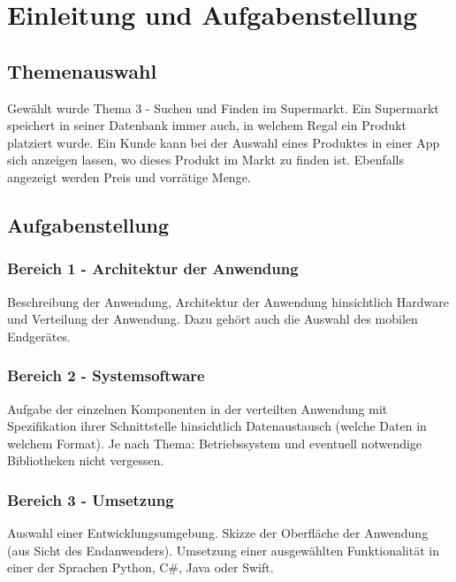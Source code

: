 \section{Einleitung und Aufgabenstellung}

\subsection{Themenauswahl}
Gewählt wurde Thema 3 - Suchen und Finden im Supermarkt.
Ein Supermarkt speichert in seiner Datenbank immer auch, in welchem Regal ein Produkt platziert wurde.
Ein Kunde kann bei der Auswahl eines Produktes in einer App sich anzeigen lassen, wo dieses Produkt im Markt zu finden ist.
Ebenfalls angezeigt werden Preis und vorrätige Menge.

\subsection{Aufgabenstellung}
\subsubsection{Bereich 1 - Architektur der Anwendung}
Beschreibung der Anwendung, Architektur der Anwendung hinsichtlich Hardware und Verteilung der Anwendung.
Dazu gehört auch die Auswahl des mobilen Endgerätes.

\subsubsection{Bereich 2 - Systemsoftware}
Aufgabe der einzelnen Komponenten in der verteilten Anwendung mit Spezifikation ihrer Schnittstelle hinsichtlich Datenaustausch (welche Daten in welchem Format).
Je nach Thema: Betriebssystem und eventuell notwendige Bibliotheken nicht vergessen.

\subsubsection{Bereich 3 - Umsetzung}
Auswahl einer Entwicklungsumgebung.
Skizze der Oberfläche der Anwendung (aus Sicht des Endanwenders).
Umsetzung einer ausgewählten Funktionalität in einer der Sprachen Python, C\#, Java oder Swift.